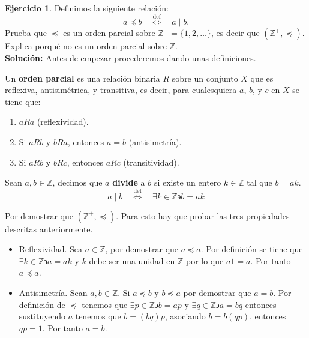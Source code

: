 \documentclass[11pt,letterpaper]{article}
\theoremstyle{definition}\newtheorem{p}{Ejercicio}
\theoremstyle{definition}\newtheorem{pp}[p]{$(*)$Ejercicio}
\numberwithin{p}{section}
\newcommand{\Z}{\mathbb{Z}}
\newcommand{\sii}{\Longleftrightarrow}
\newcommand{\sol}{\textbf{\underline{Solución}: }} %
\begin{document}
\begin{p} %
  Definimos la siguiente relaci\'on:
  \[
    a\preccurlyeq b\quad\stackrel{\text{def}}{\sii}\quad a\mid b.
  \]
  Prueba que $\preccurlyeq$ es un orden parcial sobre $\Z^+=\{1,2,\ldots\}$, es decir que $(\Z^+,\preccurlyeq)$.
  Explica porqu\'e no es un orden parcial sobre $\Z$.\\
  
  \sol Antes de empezar procederemos dando unas definiciones.
  
  \begin{definition}
  Un \textbf{orden parcial} es una relación binaria $R$ sobre un conjunto $X$ que es reflexiva, 
  antisimétrica, y transitiva, es decir, para cualesquiera $a$, $b$, y $c$ en $X$ se tiene que:
  \begin{enumerate}
      \item $aRa$ (reflexividad).
      \item Si $aRb$ y $bRa$, entonces $a=b$ (antisimetría).
      \item Si $aRb$ y $bRc$, entonces $aRc$ (transitividad).
  \end{enumerate}
  \end{definition} 
  
  \begin{definition}
  Sean $a, b \in \Z$, decimos que $a$ \textbf{divide} a $b$ si existe un entero $k \in \Z$ tal 
  que $b=ak$.
  \[
    a \mid b \quad\stackrel{\text{def}}{\sii} \quad  \exists k \in \Z \backepsilon b=ak
  \]
  \end{definition}
  
  Por demostrar que  $(\Z^+,\preccurlyeq)$. Para esto hay que probar las tres propiedades descritas
  anteriormente.
  \begin{itemize}
      \item \underline{Reflexividad}. Sea $a \in \Z$, por demostrar que $a \preccurlyeq a$.
      Por definición se tiene que $\exists k \in \Z \backepsilon a=ak$ y $k$ debe ser una unidad en 
      $\Z$ por lo que $a1=a$. Por tanto $a \preccurlyeq a$.
      
      \item \underline{Antisimetría}. Sean $a, b \in \Z$. Si $a \preccurlyeq b$ y $b \preccurlyeq a$ 
      por demostrar que $a=b$.
      Por definición de $\preccurlyeq$ tenemos que $\exists p \in \Z \backepsilon b=ap$ y 
      $\exists q \in \Z \backepsilon a=bq$ entonces sustituyendo $a$ tenemos que $b=(bq)p$, asociando 
      $b=b(qp)$, entonces $qp=1$. Por tanto $a=b$.


\end{itemize}
\end{p}
\end{document}
